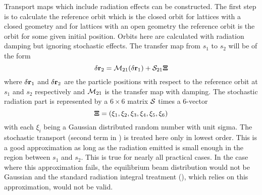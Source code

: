 Transport maps which include radiation effects can be constructed\cite{b:ohmi}. The first step is to
calculate the reference orbit which is the closed orbit for lattices with a closed geometry and for
lattices with an open geometry the reference orbit is the orbit for some given initial
position. Orbits here are calculated with radiation damping but ignoring stochastic effects. The
transfer map from $s_1$ to $s_2$ will be of the form
\begin{equation}
  \delta{\bf r}_2 = {\cal M}_{21}(\delta{\bf r}_1) + {\cal S}_{21} {\bf \Xi}
  \label{rmrsx}
\end{equation}
where $\delta{\bf r}_1$ and $\delta{\bf r}_2$ are the particle positions with respect to the reference
orbit at $s_1$ and $s_2$ respectively and ${\cal M}_{21}$ is the transfer map with damping. The
stochastic radiation part is represented by a $6\times6$ matrix ${\cal S}$ times a $6$-vector
\begin{equation}
  {\bf \Xi} = (\xi_1, \xi_2, \xi_3, \xi_4, \xi_5, \xi_6)
\end{equation}
with each $\xi_i$ being a Gaussian distributed random number with unit sigma. The stochastic
transport (second term in ) is treated here only in lowest order. This is a good
approximation as long as the radiation emitted is small enough in the region between $s_1$ and
$s_2$. This is true for nearly all practical cases. In the case where this approximation fails, the
equilibrium beam distribution would not be Gaussian and the standard radiation integral treatment
(), which relies on this approximation, would not be valid.

